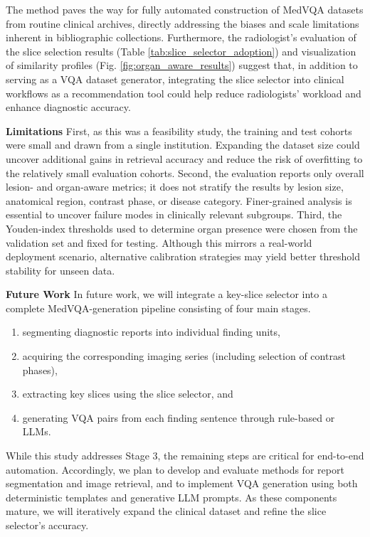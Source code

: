 \documentclass[bioengineering,article,submit,pdftex,moreauthors]{Definitions/mdpi}
\begin{document}
The method paves the way for fully automated construction of MedVQA datasets from routine clinical archives, directly addressing the biases and scale limitations inherent in bibliographic collections. 
Furthermore, the radiologist’s evaluation of the slice selection results (Table \ref{tab:slice_selector_adoption}) and visualization of similarity profiles (Fig. \ref{fig:organ_aware_results}) suggest that, in addition to serving as a VQA dataset generator, integrating the slice selector into clinical workflows as a recommendation tool could help reduce radiologists’ workload and enhance diagnostic accuracy. 


\textbf{Limitations}
First, as this was a feasibility study, the training and test cohorts were small and drawn from a single institution. Expanding the dataset size could uncover additional gains in retrieval accuracy and reduce the risk of overﬁtting to the relatively small evaluation cohorts. 
Second, the evaluation reports only overall lesion- and organ-aware metrics; it does not stratify the results by lesion size, anatomical region, contrast phase, or disease category. Finer-grained analysis is essential to uncover failure modes in clinically relevant subgroups. 
Third, the Youden-index thresholds used to determine organ presence were chosen from the validation set and fixed for testing. Although this mirrors a real-world deployment scenario, alternative calibration strategies may yield better threshold stability for unseen data. 


\textbf{Future Work}
In future work, we will integrate a key-slice selector into a complete MedVQA-generation pipeline consisting of four main stages. 
\begin{enumerate}
  \item segmenting diagnostic reports into individual finding units, 
  \item acquiring the corresponding imaging series (including selection of contrast phases),
  \item extracting key slices using the slice selector, and 
  \item generating VQA pairs from each finding sentence through rule-based or LLMs.
\end{enumerate}
While this study addresses Stage 3, the remaining steps are critical for end-to-end automation.
Accordingly, we plan to develop and evaluate methods for report segmentation and image retrieval, and to implement VQA generation using both deterministic templates and generative LLM prompts. 
As these components mature, we will iteratively expand the clinical dataset and refine the slice selector’s accuracy. 
\end{document}

